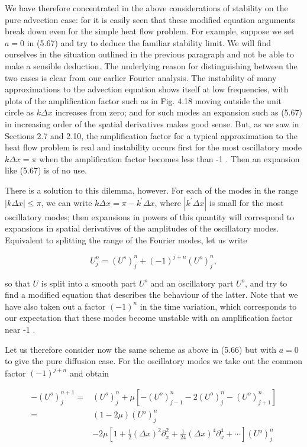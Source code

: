 \documentclass[10pt]{article}
\begin{document}
We have therefore concentrated in the above considerations of stability on the pure advection case: for it is easily seen that these modified equation arguments break down even for the simple heat flow problem. For example, suppose we set \(a=0\) in (5.67) and try to deduce the familiar stability limit. We will find ourselves in the situation outlined in the previous paragraph and not be able to make a sensible deduction. The underlying reason for distinguishing between the two cases is clear from our earlier Fourier analysis. The instability of many approximations to the advection equation shows itself at low frequencies, with plots of the amplification factor such as in Fig. 4.18 moving outside the unit circle as \(k \Delta x\) increases from zero; and for such modes an expansion such as (5.67) in increasing order of the spatial derivatives makes good sense. But, as we saw in Sections 2.7 and 2.10, the amplification factor for a typical approximation to the heat flow problem is real and instability occurs first for the most oscillatory mode \(k \Delta x=\pi\) when the amplification factor becomes less than -1 . Then an expansion like (5.67) is of no use.

There is a solution to this dilemma, however. For each of the modes in the range \(|k \Delta x| \leq \pi\), we can write \(k \Delta x=\pi-k^{\prime} \Delta x\), where \(\left|k^{\prime} \Delta x\right|\) is small for the most oscillatory modes; then expansions in powers of this quantity will correspond to expansions in spatial derivatives of the amplitudes of the oscillatory modes. Equivalent to splitting the range of the Fourier modes, let us write

\[
U_{j}^{n}=\left(U^{s}\right)_{j}^{n}+(-1)^{j+n}\left(U^{o}\right)_{j}^{n},
\]

so that \(U\) is split into a smooth part \(U^{s}\) and an oscillatory part \(U^{o}\), and try to find a modified equation that describes the behaviour of the latter. Note that we have also taken out a factor \((-1)^{n}\) in the time variation, which corresponds to our expectation that these modes become unstable with an amplification factor near -1 .

Let us therefore consider now the same scheme as above in (5.66) but with \(a=0\) to give the pure diffusion case. For the oscillatory modes we take out the common factor \((-1)^{j+n}\) and obtain

\[
\begin{aligned}
-\left(U^{o}\right)_{j}^{n+1}= & \left(U^{o}\right)_{j}^{n}+\mu\left[-\left(U^{o}\right)_{j-1}^{n}-2\left(U^{o}\right)_{j}^{n}-\left(U^{o}\right)_{j+1}^{n}\right] \\
= & (1-2 \mu)\left(U^{o}\right)_{j}^{n} \\
& -2 \mu\left[1+\frac{1}{2}(\Delta x)^{2} \partial_{x}^{2}+\frac{1}{24}(\Delta x)^{4} \partial_{x}^{4}+\cdots\right]\left(U^{o}\right)_{j}^{n}
\end{aligned}
\]
\end{document}
